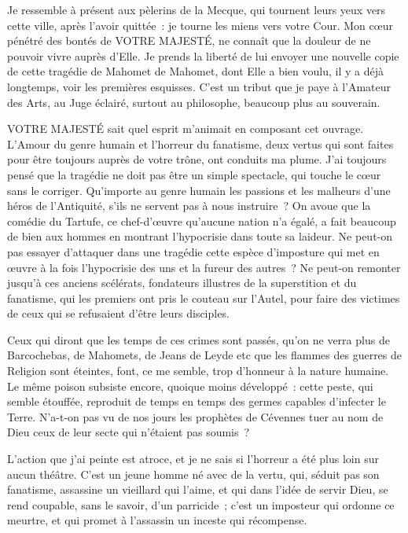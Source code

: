 \documentclass[french,twoside]{book} %
\newcommand{\salute}[1]{\bigbreak{#1}\par\medbreak}
\begin{document}
\salute{SIRE,}
\noindent Je ressemble à présent aux pèlerins de la Mecque, qui tournent leurs yeux vers cette ville, après l’avoir quittée : je tourne les miens vers votre Cour. Mon cœur pénétré des bontés de VOTRE MAJESTÉ, ne connaît que la douleur de ne pouvoir vivre auprès d’Elle. Je prends la liberté de lui envoyer une nouvelle copie de cette tragédie de Mahomet de Mahomet, dont Elle a bien voulu, il y a déjà longtemps, voir les premières esquisses. C’est un tribut que je paye à l’Amateur des Arts, au Juge éclairé, surtout au philosophe, beaucoup plus au souverain.\par
VOTRE MAJESTÉ sait quel esprit m’animait en composant cet ouvrage. L’Amour du genre humain et l’horreur du fanatisme, deux vertus qui sont faites pour être toujours auprès de votre trône, ont conduits ma plume. J’ai toujours pensé que la tragédie ne doit pas être un simple spectacle, qui touche le cœur sans le corriger. Qu’importe au genre humain les passions et les malheurs d’une héros de l’Antiquité, s’ils ne servent pas à nous instruire ? On avoue que la comédie du Tartufe, ce chef-d’œuvre qu’aucune nation n’a égalé, a fait beaucoup de bien aux hommes en montrant l’hypocrisie dans toute sa laideur. Ne peut-on pas essayer d’attaquer dans une tragédie cette espèce d’imposture qui met en œuvre à la fois l’hypocrisie des uns et la fureur des autres ? Ne peut-on remonter jusqu’à ces anciens scélérats, fondateurs illustres de la superstition et du fanatisme, qui les premiers ont pris le couteau sur l’Autel, pour faire des victimes de ceux qui se refusaient d’être leurs disciples.\par
Ceux qui diront que les temps de ces crimes sont passés, qu’on ne verra plus de Barcochebas, de Mahomets, de Jeans de Leyde etc que les flammes des guerres de Religion sont éteintes, font, ce me semble, trop d’honneur à la nature humaine. Le même poison subsiste encore, quoique moins développé : cette peste, qui semble étouffée, reproduit de temps en temps des germes capables d’infecter le Terre. N’a-t-on pas vu de nos jours les prophètes de Cévennes tuer au nom de Dieu ceux de leur secte qui n’étaient pas soumis ?\par
L’action que j’ai peinte est atroce, et je ne sais si l’horreur a été plus loin sur aucun théâtre. C’est un jeune homme né avec de la vertu, qui, séduit pas son fanatisme, assassine un vieillard qui l’aime, et qui dans l’idée de servir Dieu, se rend coupable, sans le savoir, d’un parricide ; c’est un imposteur qui ordonne ce meurtre, et qui promet à l’assassin un inceste qui récompense.\par
\end{document}
